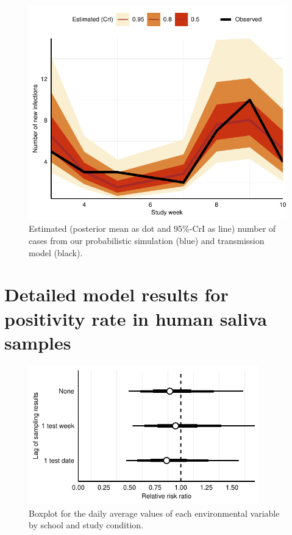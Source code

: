 \documentclass[fleqn,11pt]{wlscirep_supp}
\begin{document}
\begin{figure}[!htpb]
    \centering
    \includegraphics{../../results/epi-data/model-fit.pdf}
    \caption[Model- and simulation-based estimates of the number of COVID-19 cases]{Estimated (posterior mean as dot and 95\%-CrI as line) number of cases from our probabilistic simulation (blue) and transmission model (black).}
    \label{fig:coverage}
\end{figure}

\clearpage

\section{Detailed model results for positivity rate in human saliva samples}\label{sec:detailed-molecular}

\begin{figure}[!htb]
\centering
    \includegraphics[width=10cm]{../../results/mol-data/model-results.pdf}
    \caption[Boxplot of environmental variables by school and study condition]{Boxplot for the daily average values of each environmental variable by school and study condition.}
    \label{fig:mol-estimation-results-sensitivity}
\end{figure}
\end{document}
